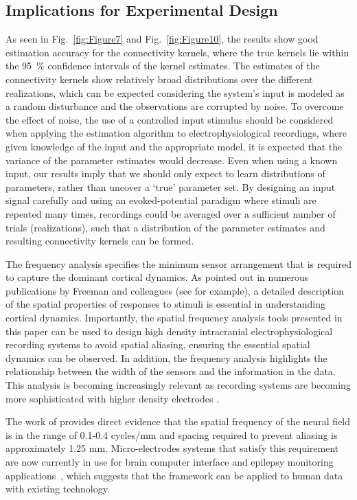 \documentclass[review,authoryear,3p]{elsarticle}
\begin{document}
\subsection{Implications for Experimental Design}
As seen in Fig.~\ref{fig:Figure7} and Fig.~\ref{fig:Figure10}, the results show good estimation accuracy for the connectivity kernels, where the true kernels lie within the 95~\% confidence intervals of the kernel estimates. The estimates of the connectivity kernels show relatively broad distributions over the different realizations, which can be expected considering the system's input is modeled as a random disturbance and the observations are corrupted by noise. To overcome the effect of noise, the use of a controlled input stimulus should be considered when applying the estimation algorithm to electrophysiological recordings, where given knowledge of the input and the appropriate model, it is expected that the variance of the parameter estimates would decrease. Even when using a known input, our results imply that we should only expect to learn distributions of parameters, rather than uncover a `true' parameter set. By designing an input signal carefully and using an evoked-potential paradigm where stimuli are repeated many times, recordings could be averaged over a sufficient number of trials (realizations), such that a distribution of the parameter estimates and resulting connectivity kernels can be formed.

The frequency analysis specifies the minimum sensor arrangement that is required to capture the dominant cortical dynamics. As pointed out in numerous publications by Freeman and colleagues (see \citet{Freeman1987} for example), a detailed description of the spatial properties of responses to stimuli is essential in understanding cortical dynamics. Importantly, the spatial frequency analysis tools presented in this paper can be used to design high density intracranial electrophysiological recording systems to avoid spatial aliasing, ensuring the essential spatial dynamics can be observed. In addition, the frequency analysis highlights the relationship between the width of the sensors and the information in the data. This analysis is becoming increasingly relevant as recording systems are becoming more sophisticated with higher density electrodes \citep{Brinkmann2009}.

The work of \citet{Freeman2000} provides direct evidence that the spatial frequency of the neural field is in the range of 0.1-0.4 cycles/mm and spacing required to prevent aliasing is approximately 1.25 mm. Micro-electrodes systems that satisfy this requirement are now currently in use for brain computer interface and epilepsy monitoring applications~\citep{Cheung2007}, which suggests that the framework can be applied to human data with existing technology. 
\end{document}

